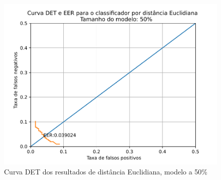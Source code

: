 \begin{frame}
{\begin{columns}
			\begin{figure}
				\centering
				\includegraphics[width=\linewidth]{../monography/images/results/det/DET_for_classifier_Euclidian_50}
				\caption{Curva DET dos resultados de distância Euclidiana, modelo a 50\%}
			\end{figure}
		\end{columns}
	}
\end{frame}

